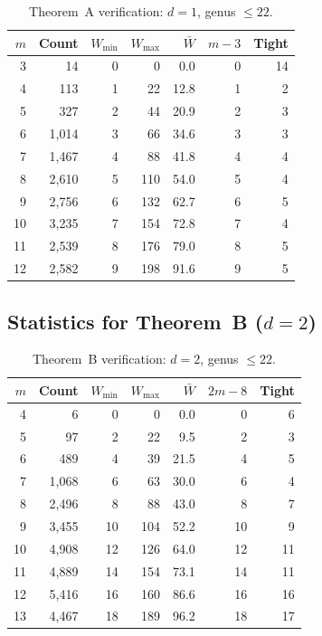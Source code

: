 \documentclass[11pt]{amsart}
\theoremstyle{definition}
\theoremstyle{remark}
\begin{document}
\begin{table}[ht]
\centering
\caption{Theorem~A verification: $d = 1$, genus $\le 22$.}\label{tab:thA-stats}
\begin{tabular}{rrrrrrr}
\toprule
$m$ & Count & $W_{\min}$ & $W_{\max}$ & $\bar{W}$ & $m-3$ & Tight \\
\midrule
 3 &    14 &   0 &     0 &   0.0 &  0 & 14 \\
 4 &   113 &   1 &    22 &  12.8 &  1 &  2 \\
 5 &   327 &   2 &    44 &  20.9 &  2 &  3 \\
 6 & 1{,}014 &   3 &    66 &  34.6 &  3 &  3 \\
 7 & 1{,}467 &   4 &    88 &  41.8 &  4 &  4 \\
 8 & 2{,}610 &   5 &   110 &  54.0 &  5 &  4 \\
 9 & 2{,}756 &   6 &   132 &  62.7 &  6 &  5 \\
10 & 3{,}235 &   7 &   154 &  72.8 &  7 &  4 \\
11 & 2{,}539 &   8 &   176 &  79.0 &  8 &  5 \\
12 & 2{,}582 &   9 &   198 &  91.6 &  9 &  5 \\
\bottomrule
\end{tabular}
\end{table}

\subsection{Statistics for Theorem~B ($d=2$)}

\begin{table}[ht]
\centering
\caption{Theorem~B verification: $d = 2$, genus $\le 22$.}\label{tab:thB-stats}
\begin{tabular}{rrrrrrr}
\toprule
$m$ & Count & $W_{\min}$ & $W_{\max}$ & $\bar{W}$ & $2m-8$ & Tight \\
\midrule
 4 &     6 &  0 &    0 &   0.0 &  0 &  6 \\
 5 &    97 &  2 &   22 &   9.5 &  2 &  3 \\
 6 &   489 &  4 &   39 &  21.5 &  4 &  5 \\
 7 & 1{,}068 &  6 &   63 &  30.0 &  6 &  4 \\
 8 & 2{,}496 &  8 &   88 &  43.0 &  8 &  7 \\
 9 & 3{,}455 & 10 &  104 &  52.2 & 10 &  9 \\
10 & 4{,}908 & 12 &  126 &  64.0 & 12 & 11 \\
11 & 4{,}889 & 14 &  154 &  73.1 & 14 & 11 \\
12 & 5{,}416 & 16 &  160 &  86.6 & 16 & 16 \\
13 & 4{,}467 & 18 &  189 &  96.2 & 18 & 17 \\
\bottomrule
\end{tabular}
\end{table}
\end{document}
